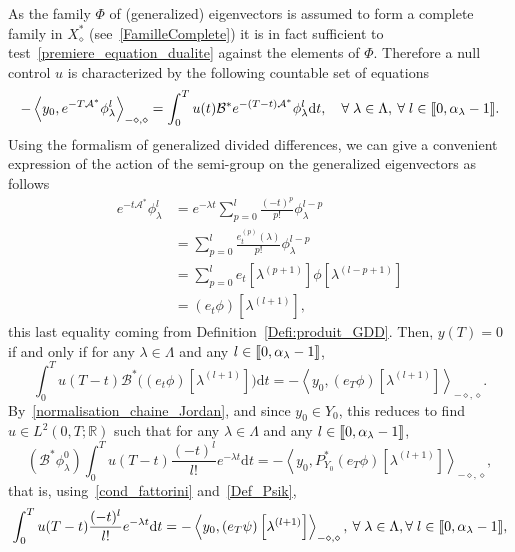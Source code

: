 \documentclass[10pt]{amsart}
\theoremstyle{definition}\newtheorem{defi}[theo]{Definition}\newtheorem{rema}[theo]{Remark}\newtheorem{exam}[theo]{Example}\newtheorem{exem}[theo]{Example}\newtheorem{nota}[theo]{Notation}
\newcommand{\llbracket}{\mathopen{[\mkern -2.7mu[}}
\newcommand{\rrbracket}{\mathclose{]\mkern -2.7mu]}}
\newcommand{\inter}[2]{\llbracket #1,#2 \rrbracket}
\newcommand\As{\mathcal{A}^*}
\newcommand\Bs{\mathcal{B}^*}
\newcommand{\Xalphas}{X_\diamond^*}
\newcommand{\Fzp}{Y_0}
\newcommand{\dual}[2]{\left\langle #1, #2 \right\rangle_{-\diamond,\diamond}}
\newcommand{\PFa}{P_{\Fzp}^*}
\newcommand{\R}{\mathbb{R}}
\newcommand{\md}{\mathrm{d}}
\let\oldforall\forall
\renewcommand*{\forall}{\mathrel{\oldforall}}
\begin{document}
As the family $\Phi$ of (generalized) eigenvectors is assumed to form a complete family in $\Xalphas$ (see~\eqref{FamilleComplete}) it is in fact sufficient to test~\eqref{premiere_equation_dualite} against the elements of $\Phi$. Therefore a null control $u$ is characterized by the following countable set of equations
\begin{equation}\label{pb_moment_v1}
-\dual{y_0}{e^{-T \As} \phi_\lambda^l} = \int_0^T u(t) \Bs e^{-(T-t) \As} \phi_\lambda^l \md t, \quad \forall \lambda \in \Lambda, \: \forall l \in \inter{0}{\alpha_\lambda-1}.
\end{equation}
Using the formalism of generalized divided differences, we can give a convenient expression of the action of the semi-group on the generalized eigenvectors as follows
\begin{equation}\label{Action_SemiGroupe_DDgeneralisees}
\begin{aligned}
e^{-t\As} \phi_\lambda^l & = e^{-\lambda t} \sum_{p=0}^l \frac{(-t)^p}{p!} \phi_\lambda^{l-p} \\
& = \sum_{p=0}^l \frac{e_t^{(p)}(\lambda)}{p!} \phi_\lambda^{l-p} \\
& = \sum_{p=0}^l e_t\left[\lambda^{(p+1)}\right] \phi\left[\lambda^{(l-p+1)}\right] \\
& = (e_t \phi) \left[\lambda^{(l+1)}\right],
\end{aligned}
\end{equation}
this last equality coming from Definition~\ref{Defi:produit_GDD}. Then, $y(T)=0$ if and only if for any $\lambda\in \Lambda$ and any $l\in \inter{0}{\alpha_{\lambda}-1}$,
\[
\int_0^T u(T-t) \Bs \big((e_t \phi) \left[\lambda^{(l+1)}\right] \big) \md t = -\dual{y_0}{(e_T \phi) \left[\lambda^{(l+1)}\right] }.
\]
By~\eqref{normalisation_chaine_Jordan}, and since $y_0\in \Fzp$, this reduces to find $u \in L^2(0,T;\R)$ such that for any $\lambda\in \Lambda$ and any $l\in \inter{0}{\alpha_{\lambda}-1}$,
\[
\left(\Bs \phi_{\lambda}^0\right) \int_0^T u(T-t) \frac{(-t)^l}{l!} e^{-\lambda t} \md t = -\dual{y_0}{\PFa (e_T \phi) \left[\lambda^{(l+1)}\right] },
\]
that is, using~\eqref{cond_fattorini} and~\eqref{Def_Psik},
\begin{equation}\label{Pbmoment_DDgeneralisees}
\int_0^T u(T-t) \frac{(-t)^l}{l!} e^{-\lambda t} \md t = -\dual{y_0}{(e_T \psi) \left[\lambda^{(l+1)}\right] }, \: \forall \lambda\in \Lambda,\forall l\in \inter{0}{\alpha_{\lambda}-1},
\end{equation}
\end{document}
